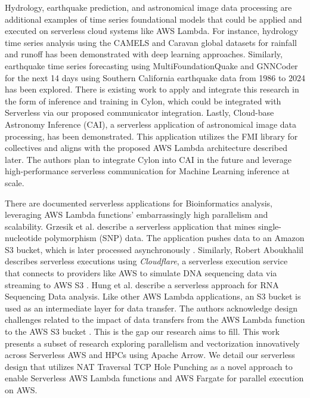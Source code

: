 \documentclass[conference]{IEEEtran}
\begin{document}
Hydrology, earthquake prediction, and astronomical image data processing are additional examples of time series foundational models that could be applied and executed on serverless cloud systems like AWS Lambda. For instance, hydrology time series analysis using the CAMELS and Caravan global datasets for rainfall and runoff has been demonstrated with deep learning approaches\cite{he2024science,osti_10634837}.  Similarly, earthquake time series forecasting using MultiFoundationQuake and GNNCoder for the next 14 days using Southern California earthquake data from 1986 to 2024 has been explored\cite{jafari2024time}.  There is existing work to apply and integrate this research in the form of inference and training in Cylon, which could be integrated with Serverless via our proposed communicator integration.  Lastly, Cloud-base Astronomy Inference (CAI), a serverless application of astronomical image data processing, has been demonstrated\cite{Staylor2024cosmic}. This application utilizes the FMI library for collectives and aligns with the proposed AWS Lambda architecture described later. The authors plan to integrate Cylon into CAI in the future and leverage high-performance serverless communication for Machine Learning inference at scale.

There are documented serverless applications for Bioinformatics analysis, leveraging AWS Lambda functions' embarrassingly high parallelism and scalability. Grzesik et al. describe a serverless application that mines single-nucleotide polymorphism (SNP) data. The application pushes data to an Amazon S3 bucket, which is later processed asynchronously \cite{grzesik2022serverless}.  Similarly, Robert Aboukhalil describes serverless executions using \textit{Cloudflare}, a serverless execution service that connects to providers like AWS to simulate DNA sequencing data via streaming to AWS S3 \cite{ServerlessGenomics}.  Hung et al. describe a serverless approach for RNA Sequencing Data analysis. Like other AWS Lambda applications, an S3 bucket is used as an intermediate layer for data transfer. The authors acknowledge design challenges related to the impact of data transfers from the AWS Lambda function to the AWS S3 bucket \cite{hung2020accessible}.  This is the gap our research aims to fill. This work presents a subset of research exploring parallelism and vectorization innovatively across Serverless AWS and HPCs using Apache Arrow. We detail our serverless design that utilizes NAT Traversal TCP Hole Punching as a novel approach to enable Serverless AWS Lambda functions and AWS Fargate for parallel execution on AWS.
\end{document}
